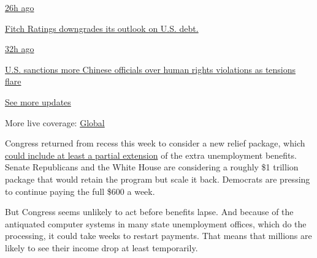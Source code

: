 \href{https://www.nytimes.com/live/2020/07/31/business/stock-market-today-coronavirus?action=click\&pgtype=Article\&state=default\&region=MAIN_CONTENT_1\&context=storylines_live_updates\#fitch-ratings-downgrades-its-outlook-on-us-debt}{26h
ago}

\href{https://www.nytimes.com/live/2020/07/31/business/stock-market-today-coronavirus?action=click\&pgtype=Article\&state=default\&region=MAIN_CONTENT_1\&context=storylines_live_updates\#fitch-ratings-downgrades-its-outlook-on-us-debt}{Fitch
Ratings downgrades its outlook on U.S. debt.}

\href{https://www.nytimes.com/live/2020/07/31/business/stock-market-today-coronavirus?action=click\&pgtype=Article\&state=default\&region=MAIN_CONTENT_1\&context=storylines_live_updates\#us-sanctions-more-chinese-officials-over-human-rights-violations-as-tensions-flare}{32h
ago}

\href{https://www.nytimes.com/live/2020/07/31/business/stock-market-today-coronavirus?action=click\&pgtype=Article\&state=default\&region=MAIN_CONTENT_1\&context=storylines_live_updates\#us-sanctions-more-chinese-officials-over-human-rights-violations-as-tensions-flare}{U.S.
sanctions more Chinese officials over human rights violations as
tensions flare}

\href{https://www.nytimes.com/live/2020/07/31/business/stock-market-today-coronavirus?action=click\&pgtype=Article\&state=default\&region=MAIN_CONTENT_1\&context=storylines_live_updates}{See
more updates}

More live coverage:
\href{https://www.nytimes.com/2020/08/01/world/coronavirus-covid-19.html?action=click\&pgtype=Article\&state=default\&region=MAIN_CONTENT_1\&context=storylines_live_updates}{Global}

Congress returned from recess this week to consider a new relief
package, which
\href{https://www.nytimes.com/2020/07/20/us/politics/congress-coronavirus-aid-package.html}{could
include at least a partial extension} of the extra unemployment
benefits. Senate Republicans and the White House are considering a
roughly \$1 trillion package that would retain the program but scale it
back. Democrats are pressing to continue paying the full \$600 a week.

But Congress seems unlikely to act before benefits lapse. And because of
the antiquated computer systems in many state unemployment offices,
which do the processing, it could take weeks to restart payments. That
means that millions are likely to see their income drop at least
temporarily.

